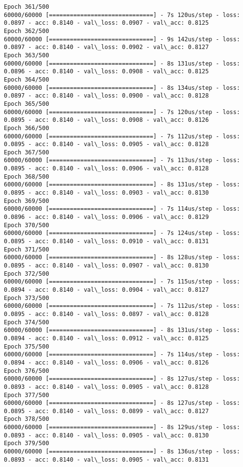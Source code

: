 \documentclass[11pt]{article}
\begin{document}
\begin{Verbatim}[commandchars=\\\{\}]
Epoch 361/500
60000/60000 [==============================] - 7s 120us/step - loss: 0.0897 - acc: 0.8140 - val\_loss: 0.0907 - val\_acc: 0.8125
Epoch 362/500
60000/60000 [==============================] - 9s 142us/step - loss: 0.0897 - acc: 0.8140 - val\_loss: 0.0902 - val\_acc: 0.8127
Epoch 363/500
60000/60000 [==============================] - 8s 131us/step - loss: 0.0896 - acc: 0.8140 - val\_loss: 0.0908 - val\_acc: 0.8125
Epoch 364/500
60000/60000 [==============================] - 8s 134us/step - loss: 0.0897 - acc: 0.8140 - val\_loss: 0.0900 - val\_acc: 0.8128
Epoch 365/500
60000/60000 [==============================] - 7s 120us/step - loss: 0.0895 - acc: 0.8140 - val\_loss: 0.0908 - val\_acc: 0.8126
Epoch 366/500
60000/60000 [==============================] - 7s 112us/step - loss: 0.0895 - acc: 0.8140 - val\_loss: 0.0905 - val\_acc: 0.8128
Epoch 367/500
60000/60000 [==============================] - 7s 113us/step - loss: 0.0895 - acc: 0.8140 - val\_loss: 0.0906 - val\_acc: 0.8128
Epoch 368/500
60000/60000 [==============================] - 8s 131us/step - loss: 0.0895 - acc: 0.8140 - val\_loss: 0.0903 - val\_acc: 0.8130
Epoch 369/500
60000/60000 [==============================] - 7s 114us/step - loss: 0.0896 - acc: 0.8140 - val\_loss: 0.0906 - val\_acc: 0.8129
Epoch 370/500
60000/60000 [==============================] - 7s 124us/step - loss: 0.0895 - acc: 0.8140 - val\_loss: 0.0910 - val\_acc: 0.8131
Epoch 371/500
60000/60000 [==============================] - 8s 128us/step - loss: 0.0895 - acc: 0.8140 - val\_loss: 0.0907 - val\_acc: 0.8130
Epoch 372/500
60000/60000 [==============================] - 7s 115us/step - loss: 0.0894 - acc: 0.8140 - val\_loss: 0.0904 - val\_acc: 0.8127
Epoch 373/500
60000/60000 [==============================] - 7s 112us/step - loss: 0.0895 - acc: 0.8140 - val\_loss: 0.0897 - val\_acc: 0.8128
Epoch 374/500
60000/60000 [==============================] - 8s 131us/step - loss: 0.0894 - acc: 0.8140 - val\_loss: 0.0912 - val\_acc: 0.8125
Epoch 375/500
60000/60000 [==============================] - 7s 114us/step - loss: 0.0894 - acc: 0.8140 - val\_loss: 0.0906 - val\_acc: 0.8126
Epoch 376/500
60000/60000 [==============================] - 8s 127us/step - loss: 0.0893 - acc: 0.8140 - val\_loss: 0.0905 - val\_acc: 0.8128
Epoch 377/500
60000/60000 [==============================] - 8s 127us/step - loss: 0.0895 - acc: 0.8140 - val\_loss: 0.0899 - val\_acc: 0.8127
Epoch 378/500
60000/60000 [==============================] - 8s 129us/step - loss: 0.0893 - acc: 0.8140 - val\_loss: 0.0905 - val\_acc: 0.8130
Epoch 379/500
60000/60000 [==============================] - 8s 136us/step - loss: 0.0893 - acc: 0.8140 - val\_loss: 0.0905 - val\_acc: 0.8131

\end{Verbatim}
\end{document}
